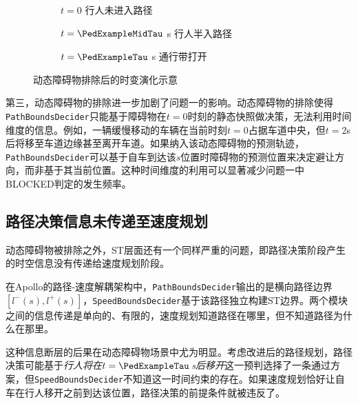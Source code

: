 \begin{figure}[htbp]
\centering
\begin{subfigure}[b]{0.32\textwidth}
  \centering
  \caption{$t=0$ 行人未进入路径}
  \label{fig:dynamic_exclusion:a}
\end{subfigure}\hfill
\begin{subfigure}[b]{0.32\textwidth}
  \centering
  \caption{$t=\PedExampleMidTau$ s 行人半入路径}
  \label{fig:dynamic_exclusion:b}
\end{subfigure}\hfill
\begin{subfigure}[b]{0.32\textwidth}
  \centering
  \caption{$t=\PedExampleTau$ s 通行带打开}
  \label{fig:dynamic_exclusion:c}
\end{subfigure}
\caption{动态障碍物排除后的时变演化示意}
\label{fig:dynamic_exclusion}
\end{figure}

第三，动态障碍物的排除进一步加剧了问题一的影响。动态障碍物的排除使得\texttt{PathBoundsDecider}只能基于障碍物在$t = 0$时刻的静态快照做决策，无法利用时间维度的信息。例如，一辆缓慢移动的车辆在当前时刻$t = 0$占据车道中央，但$t = 2$s后将移至车道边缘甚至离开车道。如果纳入该动态障碍物的预测轨迹，\texttt{PathBoundsDecider}可以基于自车到达该$s$位置时障碍物的预测位置来决定避让方向，而非基于其当前位置。这种时间维度的利用可以显著减少问题一中BLOCKED判定的发生频率。

\subsection{路径决策信息未传递至速度规划}

动态障碍物被排除之外，ST层面还有一个同样严重的问题，即路径决策阶段产生的时空信息没有传递给速度规划阶段。

在Apollo的路径-速度解耦架构中，\texttt{PathBoundsDecider}输出的是横向路径边界$[l^-(s), l^+(s)]$，\texttt{SpeedBoundsDecider}基于该路径独立构建ST边界。两个模块之间的信息传递是单向的、有限的，速度规划知道路径在哪里，但不知道路径为什么在那里。

这种信息断层的后果在动态障碍物场景中尤为明显。考虑改进后的路径规划，路径决策可能基于\emph{行人将在$t = \PedExampleTau$\,s后移开}这一预判选择了一条通过方案，但\texttt{SpeedBoundsDecider}不知道这一时间约束的存在。如果速度规划恰好让自车在行人移开之前到达该位置，路径决策的前提条件就被违反了。

